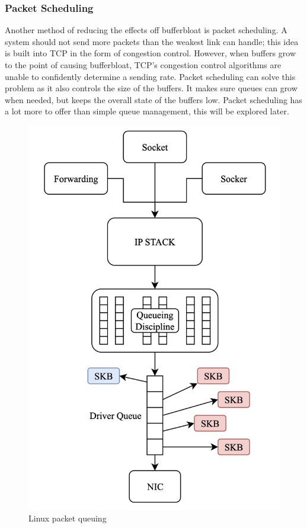 \documentclass[a4paper,english, 12pt]{report}
\begin{document}
\subsubsection{Packet Scheduling}
Another method of reducing the effects off bufferbloat is packet scheduling. A system should not send more packets than the weakest link can handle; this idea is built into TCP in the form of congestion control. However, when buffers grow to the point of causing bufferbloat, TCP's congestion control algorithms are unable to confidently determine a sending rate. Packet scheduling can solve this problem as it also controls the size of the buffers. It makes sure queues can grow when needed, but keeps the overall state of the buffers low. Packet scheduling has a lot more to offer than simple queue management, this will be explored later.\\


\begin{figure}[!h] %
	\centering
	\includegraphics[scale=0.30]{../diagrams/drawio/queueing.png}
  	\caption{Linux packet queuing}
  	\label{fig:blockage}
\end{figure}
\end{document}
